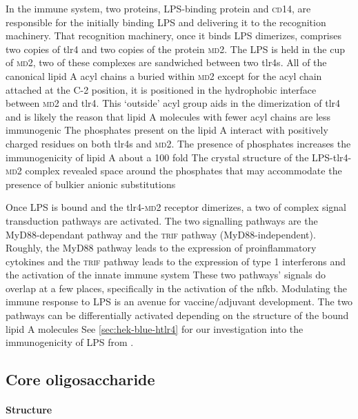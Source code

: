 In the immune system, two proteins, \ac{LPS}-binding protein and \textsc{cd}14, are responsible for the initially binding \ac{LPS} and delivering it to the recognition machinery. That recognition machinery, once it binds \ac{LPS} dimerizes, comprises two copies of \ac{tlr4} and two copies of the protein \textsc{md}2. The \ac{LPS} is held in the cup of \textsc{md}2, two of these complexes are sandwiched between two \acp{tlr4}. All of the canonical lipid A acyl chains a buried within \textsc{md}2 except for the acyl chain attached at the C-2 position, it is positioned in the hydrophobic interface between \textsc{md}2 and \ac{tlr4}. This `outside' acyl group aids in the dimerization of \ac{tlr4} and is likely the reason that lipid A molecules with fewer acyl chains are less immunogenic The phosphates present on the lipid A interact with positively charged residues on both \acp{tlr4} and \textsc{md}2. The presence of phosphates increases the immunogenicity of lipid A about a 100 fold The crystal structure of the \ac{LPS}-\ac{tlr4}-\textsc{md}2 complex revealed space around the phosphates that may accommodate the presence of bulkier anionic substitutions  

Once \ac{LPS} is bound and the \ac{tlr4}-\textsc{md}2 receptor dimerizes, a two of complex signal transduction pathways are activated. The two signalling pathways are the MyD88-dependant pathway and the \textsc{trif} pathway (MyD88-independent). Roughly, the MyD88 pathway leads to the expression of proinflammatory cytokines and the \textsc{trif} pathway leads to the expression of type 1 interferons and the activation of the innate immune system These two pathways' signals do overlap at a few places, specifically in the activation of the \ac{nfkb}. Modulating the immune response to \ac{LPS} is an avenue for vaccine/adjuvant development.  The two pathways can be differentially activated depending on the structure of the bound lipid A molecules See \cref{sec:hek-blue-htlr4} for our investigation into the immunogenicity of \ac{LPS} from \caulobacter.

  \subsection{Core oligosaccharide}\label{sec:core-oligosaccharide-intro}
  
    \paragraph{Structure}

